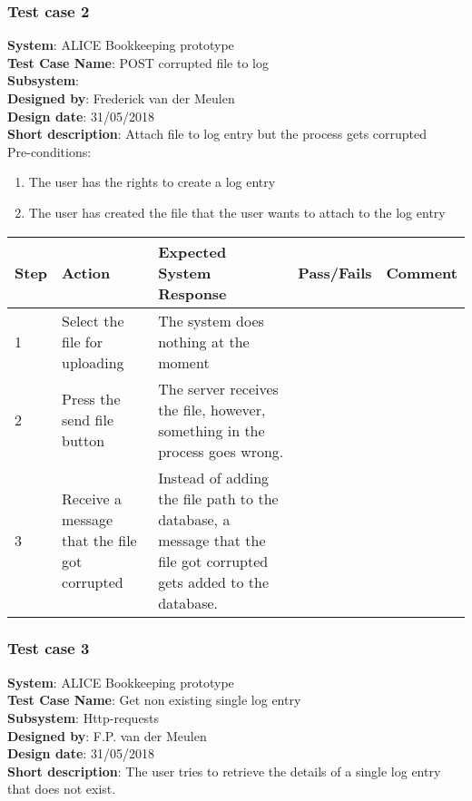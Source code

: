 \subsubsection{Test case 2}
\textbf{System}:   ALICE Bookkeeping prototype\\
\textbf{Test Case Name}:  POST corrupted file to log\\
\textbf{Subsystem}:  \\
\textbf{Designed by}:  Frederick van der Meulen\\
\textbf{Design date}:  31/05/2018\\
\textbf{Short description}: Attach file to log entry but the process gets corrupted \\

Pre-conditions: \\
\begin{enumerate}
\item The user has the rights to create a log entry
\item The user has created the file that the user wants to attach to the log entry
\end{enumerate}
\newpage
\begin{longtable}{ | p{0.8cm} | p{4.5cm} | p{6cm} | p{1.5cm} | p{1.5cm} |}
\hline
Step & Action & Expected System Response & Pass/Fails & Comment \\ \hline
1 & Select the file for uploading & The system does nothing at the moment & & \\ \hline
2 & Press the send file button & The server receives the file, however, something in the process goes wrong. & & \\ \hline
3 & Receive a message that the file got corrupted & Instead of adding the file path to the database, a message that the file got corrupted gets added to the database. & & \\ \hline
\end{longtable}
\subsubsection{Test case 3}
\textbf{System}:  ALICE Bookkeeping prototype \\
\textbf{Test Case Name}:  Get non existing single log entry \\
\textbf{Subsystem}:  Http-requests \\
\textbf{Designed by}:  F.P. van der Meulen\\
\textbf{Design date}: 31/05/2018 \\
\textbf{Short description}: The user tries to retrieve the details of a single log entry that does not exist. \\

